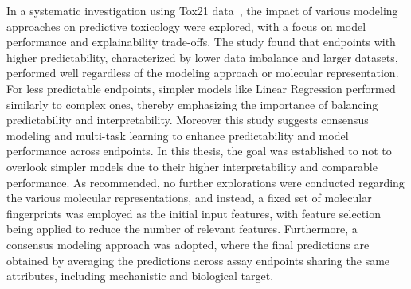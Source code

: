 In a systematic investigation using Tox21 data~\cite{wu2021}, the impact of various modeling approaches on predictive toxicology were explored, with a focus on model performance and explainability trade-offs. The study found that endpoints with higher predictability, characterized by lower data imbalance and larger datasets, performed well regardless of the modeling approach or molecular representation. For less predictable endpoints, simpler models like Linear Regression performed similarly to complex ones, thereby emphasizing the importance of balancing predictability and interpretability. Moreover this study suggests consensus modeling and multi-task learning to enhance predictability and model performance across endpoints. In this thesis, the goal was established to not to overlook simpler models due to their higher interpretability and comparable performance. As recommended, no further explorations were conducted regarding the various molecular representations, and instead, a fixed set of molecular fingerprints was employed as the initial input features, with feature selection being applied to reduce the number of relevant features. Furthermore, a consensus modeling approach was adopted, where the final predictions are obtained by averaging the predictions across assay endpoints sharing the same attributes, including mechanistic and biological target.